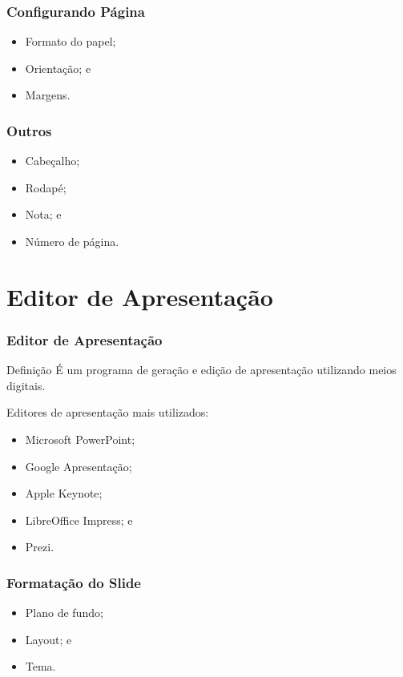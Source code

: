 \documentclass[aspectratio=169]{beamer} %
\begin{document}
\begin{frame}
	\frametitle{Configurando Página}
			
	\begin{itemize}
		\item Formato do papel; 
		\item Orientação; e 
		\item Margens.
	\end{itemize}
\end{frame}

\begin{frame}
	\frametitle{Outros}
			
	\begin{itemize}
		\item Cabeçalho;
		\item Rodapé;
		\item Nota; e
		\item Número de página.
	\end{itemize}
\end{frame}

\section{Editor de Apresenta\c cão}

\begin{frame}
	\frametitle{Editor de Apresenta\c cão}
	
	\begin{block}{Defini\c cão}
		É um programa de  geração e edição de apresentação utilizando meios digitais.
	\end{block} \vfill
		
	Editores de apresenta\c cão mais utilizados:
	\begin{itemize}
		\item Microsoft PowerPoint;
		\item Google Apresenta\c cão;
		\item Apple Keynote;
		\item LibreOffice Impress; e
		\item Prezi.
	\end{itemize}
\end{frame}

\begin{frame}
	\frametitle{Formata\c cão do Slide}
			
	\begin{itemize}
		\item Plano de fundo;
		\item Layout; e
		\item Tema.
	\end{itemize}
\end{frame}
\end{document}
